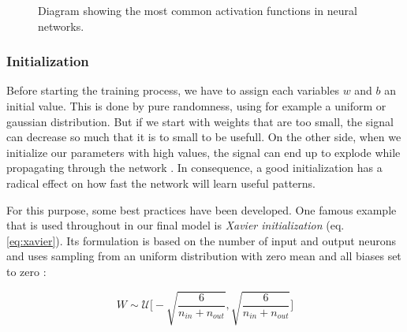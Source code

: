 \begin{figure}[htpb]
  \centering
  \caption[Activation functions]{Diagram showing the most common activation functions in neural networks.}\label{fig:activations}
\end{figure}

\subsubsection{Initialization}

Before starting the training process, we have to assign each variables $ w $ and $ b $ an initial value. This is done by pure randomness, using for example a uniform or gaussian distribution. But if we start with weights that are too small, the signal can decrease so much that it is to small to be usefull. On the other side, when we initialize our parameters with high values, the signal can end up to explode while propagating through the network \parencite{understand_xavier}. In consequence, a good initialization has a radical effect on how fast the network will learn useful patterns.

For this purpose, some best practices have been developed. One famous example that is used throughout in our final model is \textit{Xavier initialization} (eq. \ref{eq:xavier}). Its formulation is based on the number of input and output neurons and uses sampling from an uniform distribution with zero mean and all biases set to zero \parencite{xavier-init}:

\begin{equation} \label{eq:xavier}
  W \sim \mathcal{U} \bigg[-\sqrt{\frac{6}{n_{in} + n_{out}}}, \sqrt{\frac{6}{n_{in} + n_{out}}}\bigg]
\end{equation}

